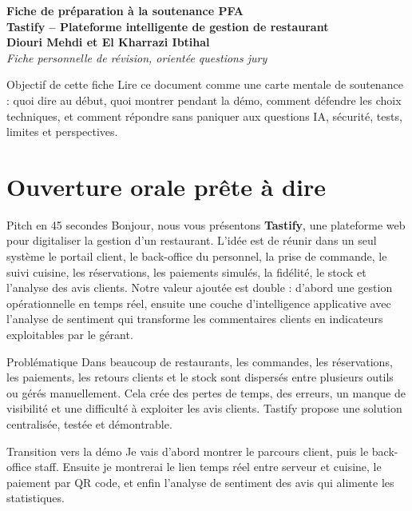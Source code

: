 \documentclass[10pt,a4paper]{article}
\newcommand{\important}[1]{\textbf{\color{blue!45!black}#1}}
\begin{document}
\begin{center}
{\LARGE \textbf{Fiche de préparation à la soutenance PFA}}\\
{\Large \textbf{Tastify -- Plateforme intelligente de gestion de restaurant}}\\
\vspace{2mm}
\textbf{Diouri Mehdi et El Kharrazi Ibtihal}\\
\textit{Fiche personnelle de révision, orientée questions jury}
\end{center}

\begin{alertbox}{Objectif de cette fiche}
Lire ce document comme une carte mentale de soutenance : quoi dire au début, quoi montrer pendant la démo, comment défendre les choix techniques, et comment répondre sans paniquer aux questions IA, sécurité, tests, limites et perspectives.
\end{alertbox}

\section{Ouverture orale prête à dire}

\begin{phrasebox}{Pitch en 45 secondes}
Bonjour, nous vous présentons \important{Tastify}, une plateforme web pour digitaliser la gestion d'un restaurant. L'idée est de réunir dans un seul système le portail client, le back-office du personnel, la prise de commande, le suivi cuisine, les réservations, les paiements simulés, la fidélité, le stock et l'analyse des avis clients. Notre valeur ajoutée est double : d'abord une gestion opérationnelle en temps réel, ensuite une couche d'intelligence applicative avec l'analyse de sentiment qui transforme les commentaires clients en indicateurs exploitables par le gérant.
\end{phrasebox}

\begin{phrasebox}{Problématique}
Dans beaucoup de restaurants, les commandes, les réservations, les paiements, les retours clients et le stock sont dispersés entre plusieurs outils ou gérés manuellement. Cela crée des pertes de temps, des erreurs, un manque de visibilité et une difficulté à exploiter les avis clients. Tastify propose une solution centralisée, testée et démontrable.
\end{phrasebox}

\begin{phrasebox}{Transition vers la démo}
Je vais d'abord montrer le parcours client, puis le back-office staff. Ensuite je montrerai le lien temps réel entre serveur et cuisine, le paiement par QR code, et enfin l'analyse de sentiment des avis qui alimente les statistiques.
\end{phrasebox}
\end{document}
